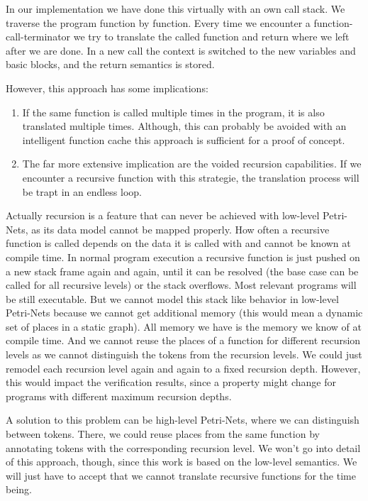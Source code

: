 In our implementation we have done this virtually with an own call stack.
We traverse the program function by function.
Every time we encounter a function-call-terminator we try to translate the called function and return where we left after we are done.
In a new call the context is switched to the new variables and basic blocks, and the return semantics is stored.

However, this approach has some implications:
\begin{enumerate}
    \item If the same function is called multiple times in the program, it is also translated multiple times.
    Although, this can probably be avoided with an intelligent function cache this approach is sufficient for a proof of concept.
    \item The far more extensive implication are the voided recursion capabilities.
    If we encounter a recursive function with this strategie, the translation process will be trapt in an endless loop.
\end{enumerate}
Actually recursion is a feature that can never be achieved with low-level Petri-Nets, as its data model cannot be mapped properly.
How often a recursive function is called depends on the data it is called with and cannot be known at compile time.
In normal program execution a recursive function is just pushed on a new stack frame again and again, until it can be resolved (the base case can be called for all recursive levels) or the stack overflows.
Most relevant programs will be still executable.
But we cannot model this stack like behavior in low-level Petri-Nets because we cannot get additional memory (this would mean a dynamic set of places in a static graph).
All memory we have is the memory we know of at compile time.
And we cannot reuse the places of a function for different recursion levels as we cannot distinguish the tokens from the recursion levels.
We could just remodel each recursion level again and again to a fixed recursion depth.
However, this would impact the verification results, since a property might change for programs with different maximum recursion depths.

A solution to this problem can be high-level Petri-Nets, where we can distinguish between tokens.
There, we could reuse places from the same function by annotating tokens with the corresponding recursion level.
We won't go into detail of this approach, though, since this work is based on the low-level semantics.
We will just have to accept that we cannot translate recursive functions for the time being.

